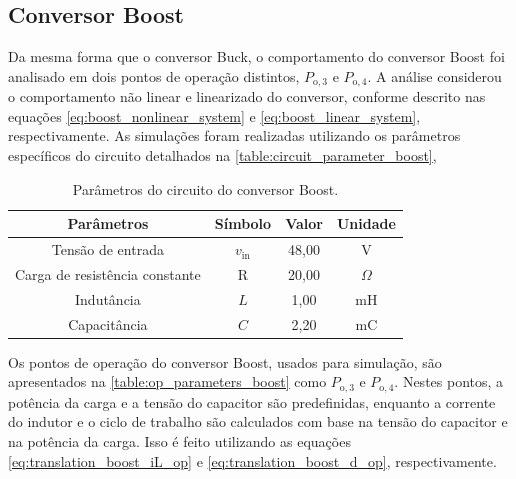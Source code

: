\subsection{Conversor Boost}

Da mesma forma que o conversor Buck, o comportamento do conversor Boost foi analisado em dois pontos de operação distintos, $P_{\mathrm{o}, 3}$ e $P_{\mathrm{o}, 4}$. A análise considerou o comportamento não linear e linearizado do conversor, conforme descrito nas equações \eqref{eq:boost_nonlinear_system} e \eqref{eq:boost_linear_system}, respectivamente. As simulações foram realizadas utilizando os parâmetros específicos do circuito detalhados na \autoref{table:circuit_parameter_boost},

\vspace{8pt}
\begin{table}[H]
  \centering
  \begin{tabular}{cccc}
    \toprule
    Parâmetros & Símbolo  & Valor & Unidade \\
    \midrule
    Tensão de entrada & $v_{\mathrm{in}}$ & 48,00 & V \\
    Carga de resistência constante & R & 20,00 & $\Omega$ \\
    Indutância & $L$ & 1,00 & mH \\
    Capacitância  & $C$ & 2,20 & mC \\
    \bottomrule
  \end{tabular}
  \caption{Parâmetros do circuito do conversor Boost.}
  \label{table:circuit_parameter_boost}
\end{table}

Os pontos de operação do conversor Boost, usados para simulação, são apresentados na \autoref{table:op_parameters_boost} como $P_{\mathrm{o}, 3}$ e $P_{\mathrm{o}, 4}$. Nestes pontos, a potência da carga e a tensão do capacitor são predefinidas, enquanto a corrente do indutor e o ciclo de trabalho são calculados com base na tensão do capacitor e na potência da carga. Isso é feito utilizando as equações \eqref{eq:translation_boost_iL_op} e \eqref{eq:translation_boost_d_op}, respectivamente.

